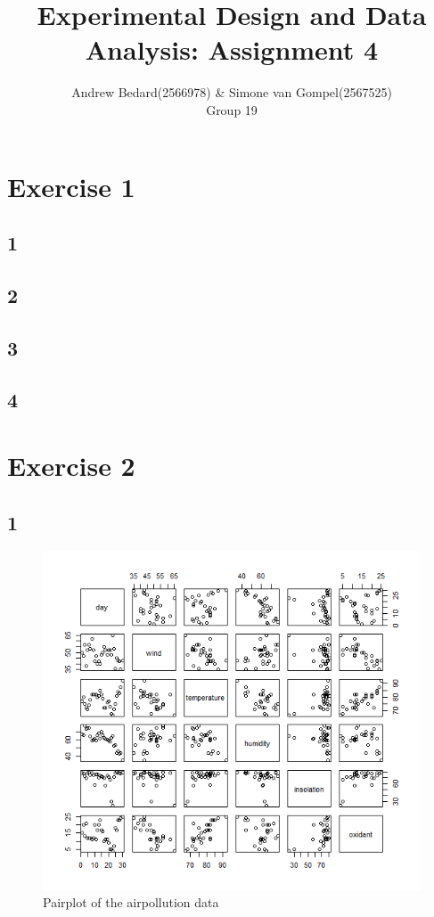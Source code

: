 \documentclass{article}
\title{Experimental Design and Data Analysis: Assignment 4}
\author{Andrew Bedard(2566978) \& Simone van Gompel(2567525) \\ Group 19}
\begin{document}
  \maketitle

  \section*{Exercise 1}
    \subsection*{1}
    \subsection*{2}
    \subsection*{3}
    \subsection*{4}
    
  \section*{Exercise 2}
    \subsection*{1}
      \begin{figure}[H]
          \centering
          \includegraphics[scale=0.6]{../results/2_1.png}
          \caption{Pairplot of the airpollution data}
          \label{fig:BoxHours}
      \end{figure} 
\end{document}
